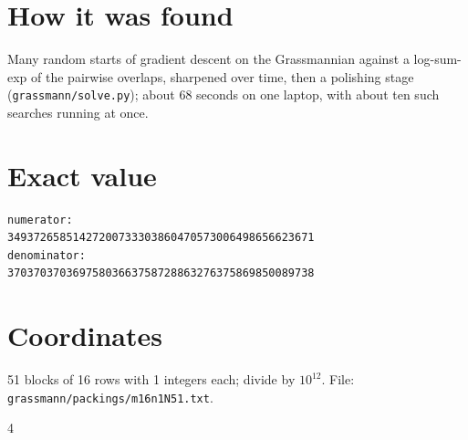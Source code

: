 \documentclass[11pt,a4paper]{article}
\begin{document}
\section{How it was found}
Many random starts of gradient descent on the Grassmannian against a log-sum-exp of the pairwise overlaps, sharpened over time, then a polishing stage (\texttt{grassmann/solve.py}); about 68 seconds on one laptop, with about ten such searches running at once.


\appendix
\section{Exact value}
{\small
\begin{verbatim}
numerator:
34937265851427200733303860470573006498656623671
denominator:
37037037036975803663758728863276375869850089738
\end{verbatim}}

\section{Coordinates}
51 blocks of 16 rows with 1 integers each; divide by $10^{12}$. File: \texttt{grassmann/packings/m16n1N51.txt}.
{\tiny
\begin{multicols}{4}
\end{multicols}}
\end{document}
